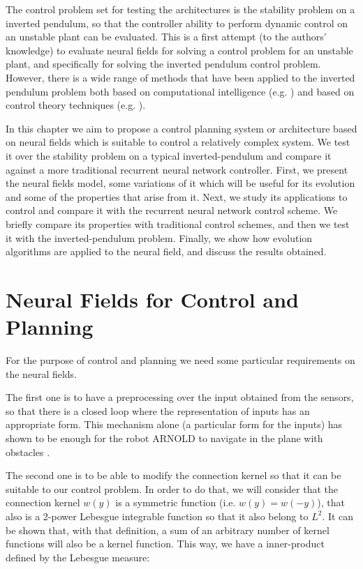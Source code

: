 The control problem set for testing the architectures is the stability
problem on a inverted pendulum, so that the controller ability to
perform dynamic control on an unstable plant can be evaluated. This is
a first attempt (to the authors' knowledge) to evaluate neural fields
for solving a control problem for an unstable plant, and specifically
for solving the inverted pendulum control problem. However, there is a
wide range of methods that have been applied to the inverted pendulum
problem both based on computational intelligence
(e.g. \cite{Anderson89Learning, Bardossy95Fuzzy, Moriarty96Efficient,
  Zhang02recurrent}) and based on control theory techniques
(e.g. \cite{Kajiwara99LPV, Huang00Control, Chang02self-tuning}).

In this chapter we aim to propose a control planning system or
architecture based on neural fields which is suitable to control a
relatively complex system. We test it over the stability problem on a
typical inverted-pendulum and compare it against a more traditional
recurrent neural network controller. First, we present the neural
fields model, some variations of it which will be useful for its
evolution and some of the properties that arise from it. Next, we
study its applications to control and compare it with the recurrent
neural network control scheme. We briefly compare its properties with
traditional control schemes, and then we test it with the
inverted-pendulum problem. Finally, we show how evolution algorithms
are applied to the neural field, and discuss the results obtained.


\section{Neural Fields for Control and Planning}
For the purpose of control and planning we need some particular
requirements on the neural fields.

The first one is to have a preprocessing over the input
obtained from the sensors, so that there is a closed loop where the
representation of inputs has an appropriate form. This mechanism alone
(a particular form for the inputs) has shown to be enough for the robot
ARNOLD to navigate in the plane with obstacles
\cite{Bergener99Complex}.

The second one is to be able to modify the connection kernel so that
it can be suitable to our control problem. In order to do that, we
will consider that the connection kernel $w(y)$ is a symmetric
function (i.e. $w(y)=w(-y)$), that also is a 2-power Lebesgue
integrable function so that it also belong to $L^2$. It can be shown
that, with that definition, a sum of an arbitrary number of kernel
functions will also be a kernel function. This way, we have a
inner-product defined by the Lebesgue measure:

